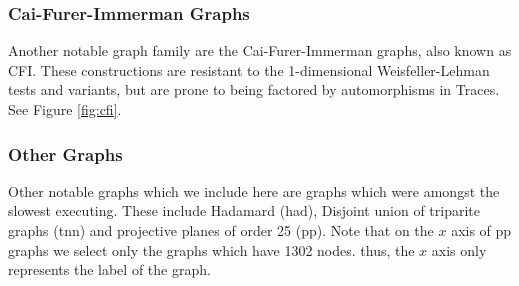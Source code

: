 \subsubsection{Cai-Furer-Immerman Graphs}
Another notable graph family are the Cai-Furer-Immerman graphs, also known as CFI. These constructions are resistant to the 1-dimensional Weisfeller-Lehman tests and variants, but are prone to being factored by automorphisms in Traces. See Figure \ref{fig:cfi}.

\subsubsection{Other Graphs}
Other notable graphs which we include here are graphs which were amongst the slowest executing. These include Hadamard (had), Disjoint union of triparite graphs (tnn) and projective planes of order 25 (pp). Note that on the $x$ axis of pp graphs we select only the graphs which have 1302 nodes. thus, the $x$ axis only represents the label of the graph.

